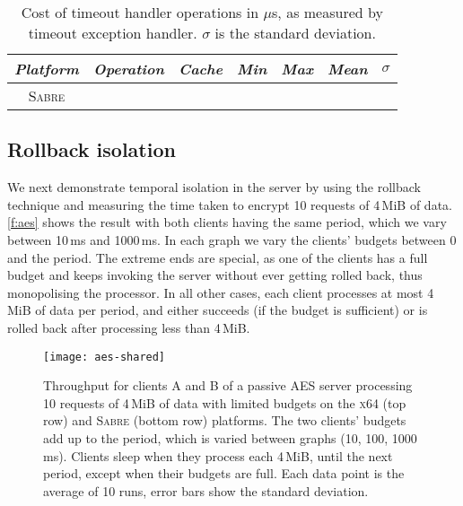 \begin{table}[t]\centering
\begin{tabular}{cllrrrr}\toprule
\emph{Platform} & \emph{Operation} & \emph{Cache} & \emph{Min} &
                          \emph{Max} & \emph{Mean} &
                          \multicolumn{1}{c}{\boldmath \(\sigma\)} \\\midrule
                          \multirow{8}{*}{\textsc{Sabre}} 
                           
                          \midrule
                          \multirow{8}{*}{\textsc{x64}}
                          
                          \bottomrule
\end{tabular}
\caption{Cost of timeout handler operations in \(\mu\)s, as measured
  by timeout exception handler. \(\sigma\) is the standard deviation.}
\label{t:rollback}
\end{table}

\subsection{Rollback isolation}

We next demonstrate temporal isolation in the server by using the rollback
technique and measuring the time taken to encrypt 10 requests of 4\,MiB of
data. \autoref{f:aes} shows the result with both clients having the same
period, which we vary between 10\,ms and 1000\,ms.
In each graph we vary the clients' budgets between 0 and the
period. The extreme ends are special, as one of the clients has a full
budget and keeps invoking the server without ever getting rolled back,
thus monopolising the processor. In all other cases, each client
processes at most 4\,MiB of data per period, and either succeeds (if
the budget is sufficient) or is rolled back after processing less than 4\,MiB.

\begin{figure*}[t]
  \centering
  \texttt{[image: aes-shared]}
  \caption{Throughput for clients A and B of a passive AES server processing 10 requests of 4\,MiB of data with
      limited budgets on the \textsc{x64} (top row) and \textsc{Sabre} (bottom row) platforms. The two clients' budgets
      add up to the period, which is varied between graphs (10, 100, 1000\,ms). Clients sleep when
      they process each 4\,MiB, until the next period, except when their budgets are full. Each data point is the average of 10 runs, error bars show the standard deviation.}
  \label{f:aes}
\end{figure*}


